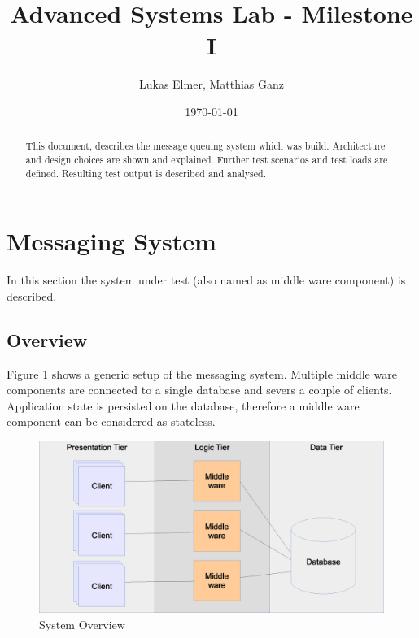 \documentclass[a4paper]{article}
\title{Advanced Systems Lab - Milestone I}
\author{Lukas Elmer, Matthias Ganz}
\date{\today}
\begin{document}
\maketitle


\begin{abstract}

This document, describes the message queuing system which was build. Architecture and design choices are shown and explained. Further test scenarios and test loads are defined. Resulting test output is described and analysed.

\end{abstract}

\section{Messaging System}
In this section the system under test (also named as middle ware component) is described.


\subsection{Overview}

Figure \ref{fig:system-overview} shows a generic setup of the messaging system. Multiple middle ware components are connected to a single database and severs a couple of clients. Application state is persisted on the database, therefore a middle ware component can be considered as stateless.


\begin{figure}
  \begin{center}
    \includegraphics[scale=0.4]{../drawings/system-overview.eps}
  \end{center}
  \caption{System Overview}
  \label{fig:system-overview}
\end{figure}
\end{document}

